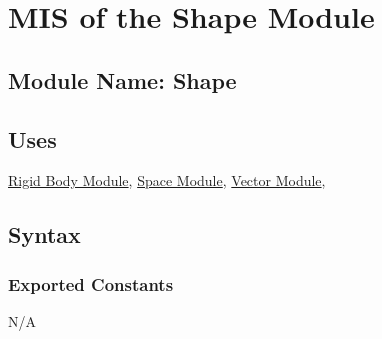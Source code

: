 \documentclass[12pt]{article}
\newcommand{\newfunc}{\\[1.5em]}
\newcommand{\R}{$\mathbb{R}$}
\newcommand{\UZ}{$\mathbb{Z}^+$}
\newcommand{\Body}{\hyperref[MISBody]{Rigid Body Module}}
\newcommand{\Space}{\hyperref[MISSpace]{Space Module}}
\newcommand{\Vector}{\hyperref[MISVector]{Vector Module}}
\begin{document}
%


\section{MIS of the Shape Module} \label{MISShape}

\subsection{Module Name: Shape} 

\subsection{Uses} \label{SecUShape}
	 \Body, \Space, \Vector,

\subsection{ Syntax}

\subsubsection{Exported Constants} \label{SecECShape}
N/A	
	
\end{document}
